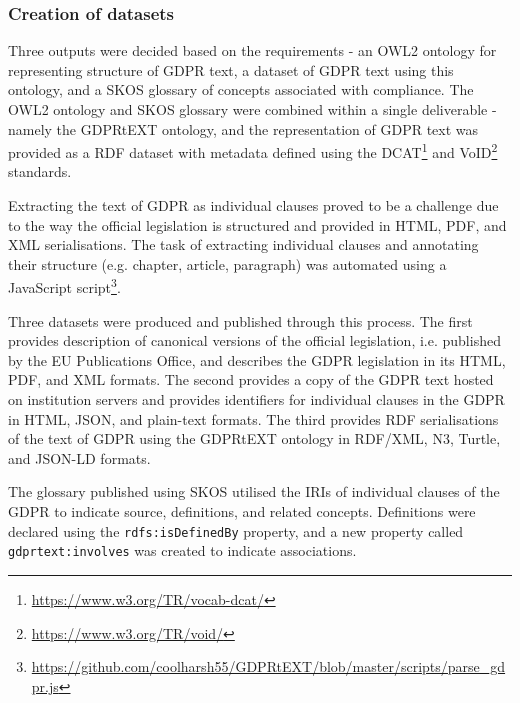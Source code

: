 \subsubsection{Creation of datasets}
Three outputs were decided based on the requirements - an OWL2 ontology for representing structure of GDPR text, a dataset of GDPR text using this ontology, and a SKOS glossary of concepts associated with compliance. The OWL2 ontology and SKOS glossary were combined within a single deliverable - namely the GDPRtEXT ontology, and the representation of GDPR text was provided as a RDF dataset with metadata defined using the DCAT\footnote{\url{https://www.w3.org/TR/vocab-dcat/}} and VoID\footnote{\url{https://www.w3.org/TR/void/}} standards.

Extracting the text of GDPR as individual clauses proved to be a challenge due to the way the official legislation is structured and provided in HTML, PDF, and XML serialisations. The task of extracting individual clauses and annotating their structure (e.g. chapter, article, paragraph) was automated using a JavaScript script\footnote{\url{https://github.com/coolharsh55/GDPRtEXT/blob/master/scripts/parse_gdpr.js}}.

Three datasets were produced and published through this process. The first provides description of canonical versions of the official legislation, i.e. published by the EU Publications Office, and describes the GDPR legislation in its HTML, PDF, and XML formats. The second provides a copy of the GDPR text hosted on institution servers and provides identifiers for individual clauses in the GDPR in HTML, JSON, and plain-text formats. The third provides RDF serialisations of the text of GDPR using the GDPRtEXT ontology in RDF/XML, N3, Turtle, and JSON-LD formats.

The glossary published using SKOS utilised the IRIs of individual clauses of the GDPR to indicate source, definitions, and related concepts. Definitions were declared using the \texttt{rdfs:isDefinedBy} property, and a new property called \texttt{gdprtext:involves} was created to indicate associations. 

